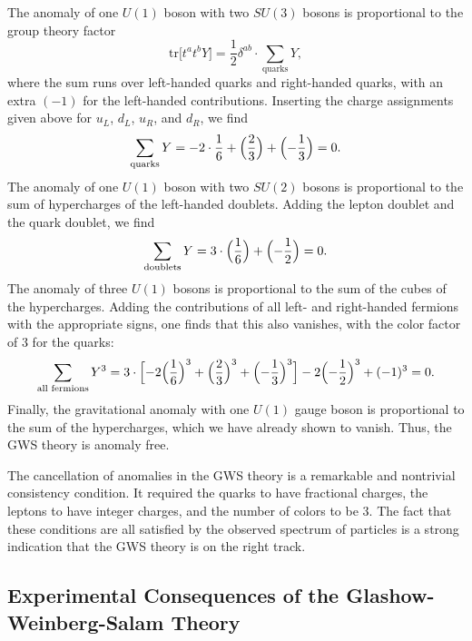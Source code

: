 The anomaly of one $U(1)$ boson with two $SU(3)$ bosons is proportional to
the group theory factor
\begin{equation}
  \mathrm{tr}\bigl[ t^at^bY \bigr] = \frac{1}{2}\delta^{ab}\cdot
    \sum_{\text{quarks}} Y ,
  \label{eq:20.83}
\end{equation}
where the sum runs over left-handed quarks and right-handed quarks, with an
extra $(-1)$ for the left-handed contributions.  Inserting the charge
assignments given above for $u_L$, $d_L$, $u_R$, and $d_R$, we find
\begin{equation}
  \sum_{\text{quarks}} Y = -2\cdot\frac{1}{6} + \Bigl( \frac{2}{3} \Bigr)
    + \Bigl( -\frac{1}{3} \Bigr) = 0 .
  \label{eq:20.84}
\end{equation}
The anomaly of one $U(1)$ boson with two $SU(2)$ bosons is proportional to
the sum of hypercharges of the left-handed doublets.  Adding the lepton
doublet and the quark doublet, we find
\begin{equation}
  \sum_{\text{doublets}} Y = 3\cdot\Bigl( \frac{1}{6} \Bigr)
    + \Bigl( -\frac{1}{2} \Bigr) = 0 .
\end{equation}
The anomaly of three $U(1)$ bosons is proportional to the sum of the cubes of
the hypercharges.  Adding the contributions of all left- and right-handed
fermions with the appropriate signs, one finds that this also vanishes, with
the color factor of 3 for the quarks:
\begin{equation}
  \sum_{\text{all fermions}} Y^3 = 3\cdot\Bigl[ -2\Bigl( \frac{1}{6} \Bigr)^3
    + \Bigl( \frac{2}{3} \Bigr)^3 + \Bigl( -\frac{1}{3} \Bigr)^3 \Bigr]
    - 2\Bigl( -\frac{1}{2} \Bigr)^3 + (-1)^3 = 0 .
  \label{eq:20.85}
\end{equation}
Finally, the gravitational anomaly with one $U(1)$ gauge boson is
proportional to the sum of the hypercharges, which we have already shown to
vanish.  Thus, the GWS theory is anomaly free.

The cancellation of anomalies in the GWS theory is a remarkable and
nontrivial consistency condition.  It required the quarks to have fractional
charges, the leptons to have integer charges, and the number of colors to be
3.  The fact that these conditions are all satisfied by the observed spectrum
of particles is a strong indication that the GWS theory is on the right
track.

\subsection{Experimental Consequences of the Glashow-Weinberg-Salam Theory}

